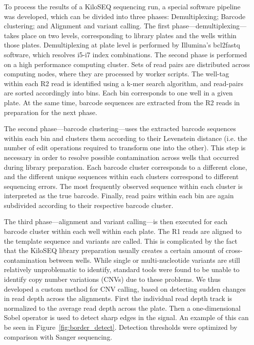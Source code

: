 To process the results of a KiloSEQ sequencing run, a special software pipeline was developed, which can be divided into three phases: Demultiplexing; Barcode clustering; and Alignment and variant calling.
The first phase---demultiplexing---takes place on two levels, corresponding to library plates and the wells within those plates. Demultiplexing at plate level is performed by Illumina's bcl2fastq software, which resolves i5-i7 index combinations. The second phase is performed on a high performance computing cluster. Sets of read pairs are distributed across computing nodes, where they are processed by worker scripts. The well-tag within each R2 read is identified using a k-mer search algorithm, and read-pairs are sorted accordingly into bins. Each bin corresponds to one well in a given plate. At the same time, barcode sequences are extracted from the R2 reads in preparation for the next phase. 

The second phase---barcode clustering---uses the extracted barcode sequences within each bin and clusters them according to their Levenstein distance\cite{Levenstein} (i.e. the number of edit operations required to transform one into the other). This step is necessary in order to resolve possible contamination across wells that occurred during library preparation. Each barcode cluster corresponds to a different clone, and the different unique sequences within each clusters correspond to different sequencing errors. The most frequently observed sequence within each cluster is interpreted as the true barcode. Finally, read pairs within each bin are again subdivided according to their respective barcode cluster.

The third phase---alignment and variant calling---is then executed for each barcode cluster within each well within each plate. The R1 reads are aligned to the template sequence and variants are called. This is complicated by the fact that the KiloSEQ library preparation usually creates a certain amount of cross-contamination between wells. While single or multi-nucleotide variants are still relatively unproblematic to identify, standard tools were found to be unable to identify copy number variations (CNVs) due to these problems. We thus developed a custom method for CNV calling, based on detecting sudden changes in read depth across the alignments. First the individual read depth track is normalized to the average read depth across the plate. Then a one-dimensional Sobel operator is used to detect sharp edges in the signal. An example of this can be seen in Figure~\ref{fig:border_detect}. Detection thresholds were optimized by comparison with Sanger sequencing.

